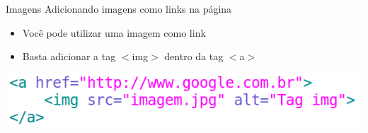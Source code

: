 \documentclass{beamer}
\begin{document}
\begin{frame}{Imagens}
  Adicionando imagens como links na página

     \begin{itemize}
      \item Você pode utilizar uma imagem como link
       \item Basta adicionar a tag $<$img$>$ dentro da tag $<$a$>$
     \end{itemize}
   

     \includegraphics[height=0.15\paperheight]{fig/aula1/html9.png}
\end{frame}

\end{document}
